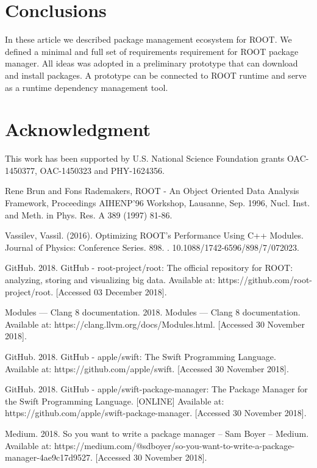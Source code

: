 \documentclass{webofc}
\begin{document}

\section{Conclusions}

In these article we described package management ecosystem for ROOT. We defined a minimal and full set of requirements requirement for ROOT package manager. All ideas was adopted in a preliminary prototype that can download and install packages. A prototype can be connected to ROOT runtime and serve as a runtime dependency management tool.

\section{Acknowledgment}

This work has been supported by U.S. National Science Foundation grants OAC-1450377, OAC-1450323 and PHY-1624356.

\begin{thebibliography}{plain}

Rene Brun and Fons Rademakers, ROOT - An Object Oriented Data Analysis Framework, Proceedings AIHENP'96 Workshop, Lausanne, Sep. 1996, Nucl. Inst. and Meth. in Phys. Res. A 389 (1997) 81-86.

Vassilev, Vassil. (2016). Optimizing ROOT's Performance Using C++ Modules. Journal of Physics: Conference Series. 898. . 10.1088/1742-6596/898/7/072023.

GitHub. 2018. GitHub - root-project/root: The official repository for ROOT: analyzing, storing and visualizing big data. Available at: https://github.com/root-project/root. [Accessed 03 December 2018].

Modules — Clang 8 documentation. 2018. Modules — Clang 8 documentation. Available at: https://clang.llvm.org/docs/Modules.html. [Accessed 30 November 2018].

GitHub. 2018. GitHub - apple/swift: The Swift Programming Language. Available at: https://github.com/apple/swift. [Accessed 30 November 2018].

GitHub. 2018. GitHub - apple/swift-package-manager: The Package Manager for the Swift Programming Language. [ONLINE] Available at: https://github.com/apple/swift-package-manager. [Accessed 30 November 2018].

Medium. 2018. So you want to write a package manager – Sam Boyer – Medium. Available at: https://medium.com/@sdboyer/so-you-want-to-write-a-package-manager-4ae9c17d9527. [Accessed 30 November 2018].


\end{thebibliography}
\end{document}
